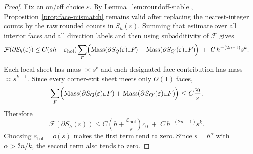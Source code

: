 \documentclass[11pt]{article}
\numberwithin{equation}{section}
\theoremstyle{plain}
\newtheorem{theorem}{Theorem}[section]
\theoremstyle{definition}
\theoremstyle{remark}
\DeclareMathOperator{\Mass}{Mass}
\newcommand{\eps}{\varepsilon}
\newcommand{\calF}{\mathcal{F}}
\begin{document}
\begin{proof}
Fix an on/off choice $\varepsilon$.  By Lemma~\ref{lem:roundoff-stable}, Proposition~\ref{prop:face-mismatch} remains valid after replacing the nearest-integer counts by the raw rounded counts in $S_h(\varepsilon)$.  Summing that estimate over all interior faces and all direction labels and then using subadditivity of $\calF$ gives
\[
\calF(\partial S_h(\varepsilon))
\le
C(s h+\eps_{\mathrm{hol}})
\sum_F\Bigl(\Mass(\partial S_Q(\varepsilon)\llcorner F)+\Mass(\partial S_{Q'}(\varepsilon)\llcorner F)\Bigr)
\;+\;
C\,h^{-(2n-1)}s^k.
\]
Each local sheet has mass $\asymp s^k$ and each designated face contribution has mass $\asymp s^{k-1}$.  Since every corner-exit sheet meets only $O(1)$ faces,
\[
\sum_F\Bigl(\Mass(\partial S_Q(\varepsilon)\llcorner F)+\Mass(\partial S_{Q'}(\varepsilon)\llcorner F)\Bigr)\le C\frac{c_0}{s}.
\]
Therefore
\[
\calF(\partial S_h(\varepsilon))
\le
C\left(h+\frac{\eps_{\mathrm{hol}}}{s}\right)c_0
\;+\;
C\,h^{-(2n-1)}s^k.
\]
Choosing $\eps_{\mathrm{hol}}=o(s)$ makes the first term tend to zero.  Since $s=h^\alpha$ with $\alpha>2n/k$, the second term also tends to zero.
\end{proof}

\iffalse
\subsection{Borderline case $p=n/2$}

The middle-dimensional case requires stronger confinement: we set $\varrho=h$, so matched displacements are $O(h^3)$ while the unmatched tail remains supported in diameter $O(h^2+s)$.

\begin{theorem}[Global coherence: $p=n/2$]\label{thm:coherence-borderline}
Assume $p=n/2$ (equivalently $k=n$).  Set $\varrho:=h$.  Choose any exponent $\alpha$ with
\[
2<\alpha<3,
\]
set $s:=h^\alpha$, and choose $\eps_{\mathrm{hol}}=o(s)$.  Then
\[
\calF(\partial S_h(\varepsilon))\longrightarrow 0
\qquad (h\downarrow 0),
\]
uniformly over all on/off choices $\varepsilon_{\alpha,h}\in\{0,1\}$.
\end{theorem}

\begin{proof}
\noindent
Remark~\ref{rem:atom-availability} guarantees that the confined template still contains enough atoms for every required prefix length.

\[
\calF(\partial S_h(\varepsilon))
\le
C(\varrho h^2+h(\varrho h+s)+\eps_{\mathrm{hol}})\frac{c_0}{s}
\;+\;
C(\varrho h+s)h^{-2n}s^{n-1}.
\]
With $\varrho=h$ this becomes
\[
\calF(\partial S_h(\varepsilon))
\le
C\left(\frac{h^3}{s}+h+\frac{\eps_{\mathrm{hol}}}{s}\right)c_0
\;+\;
C(h^2+s)h^{-2n}s^{n-1}.
\]

Now $s=h^\alpha$ with $2<\alpha<3$, so the first group tends to zero.  The final term splits as
\[
(h^2+s)h^{-2n}s^{n-1}
=
h^{2-2n+\alpha(n-1)}+h^{-2n+\alpha n},
\]
and both exponents are positive because $\alpha>2$.  Hence the whole right-hand side tends to zero.

\end{proof}
\fi
\end{document}
